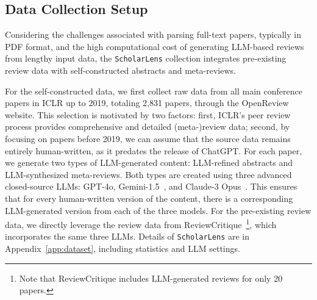 



\subsection{Data Collection Setup}




Considering the challenges associated with parsing full-text papers, typically in PDF format, and the high computational cost of generating LLM-based reviews from lengthy input data, the \texttt{ScholarLens} collection integrates pre-existing review data with self-constructed abstracts and meta-reviews.

For the self-constructed data, we first collect raw data from all main conference papers in ICLR up to 2019, totaling 2,831 papers, through the OpenReview website. 
This selection is motivated by two factors: first, ICLR's peer review process provides comprehensive and detailed (meta-)review data; second, by focusing on papers before 2019, we can assume that the source data remains entirely human-written, as it predates the release of ChatGPT. For each paper, we generate two types of LLM-generated content: LLM-refined abstracts and LLM-synthesized meta-reviews. Both types are created using three advanced closed-source LLMs: GPT-4o, Gemini-1.5~\cite{team2024gemini}, and Claude-3 Opus~\cite{claude3modelcard}. This ensures that for every human-written version of the content, there is a corresponding LLM-generated version from each of the three models.
For the pre-existing review data, we directly leverage the review data from ReviewCritique~\cite{du-etal-2024-llms}\footnote{Note that ReviewCritique includes LLM-generated reviews for only 20 papers.}, which incorporates the same three LLMs.
 Details of \texttt{ScholarLens} are in Appendix~\ref{app:dataset}, including statistics and LLM settings.

